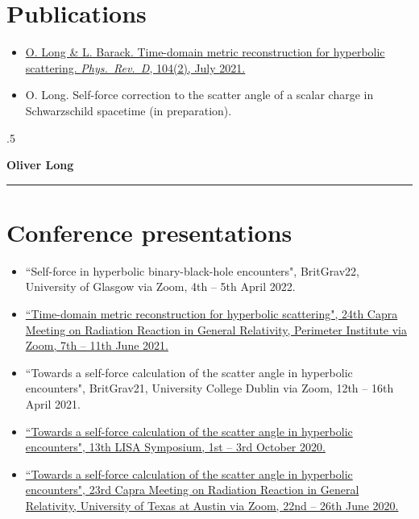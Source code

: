 \documentclass[10.5pt, oneside]{article}   	%
\begin{document}

\section*{Publications}
\begin{itemize}
\item \href{https://journals.aps.org/prd/abstract/10.1103/PhysRevD.104.024014}{O. Long \& L. Barack. Time-domain metric reconstruction for hyperbolic scattering. {\it Phys.\ Rev.\ D}, 104(2), July 2021.}
\item O. Long. Self-force correction to the scatter angle of a scalar charge in Schwarzschild spacetime (in preparation).
\end{itemize} 

\pagebreak\moveleft.5\hoffset\centerline{\Large\bf Oliver Long} %
 
\noindent\rule{\linewidth}{0.6pt}
 
 \section*{Conference presentations}
\begin{itemize}
\item ``Self-force in hyperbolic binary-black-hole encounters", BritGrav22, University of Glasgow via Zoom, 4th -- 5th April 2022.
\item \href{https://pirsa.org/21060058}{``Time-domain metric reconstruction for hyperbolic scattering", 24th Capra Meeting on Radiation Reaction in General Relativity, Perimeter Institute via Zoom, 7th -- 11th June 2021.}
\item ``Towards a self-force calculation of the scatter angle in hyperbolic encounters", BritGrav21, University College Dublin via Zoom, 12th -- 16th April 2021.
\item \href{https://lisasymposium13.lisamission.org/presentations/i0xMnRFWi7WKbO5f01caGDH0zPK2/7qz7uYC3qHuzj9AsC49h}{``Towards a self-force calculation of the scatter angle in hyperbolic encounters", 13th LISA Symposium, 1st -- 3rd October 2020.}
\item \href{https://www.youtube.com/watch?v=HB-Rw5kRUfg&t=11311s}{``Towards a self-force calculation of the scatter angle in hyperbolic encounters", 23rd Capra Meeting on Radiation Reaction in General Relativity, University of Texas at Austin via Zoom, 22nd -- 26th June 2020.}
\end{itemize} 
 
\end{document}
